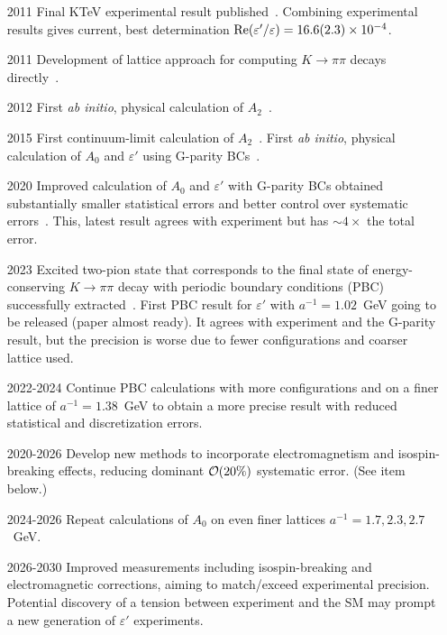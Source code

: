 \documentclass[prd,showpacs,showkeys,preprintnumbers,floatfix,
nofootinbib%
]{revtex4-2}
\begin{document}
\begin{itemize}
    \item[2011] Final KTeV experimental result published~\cite{KTeV:2010sng}. Combining experimental results gives current, best determination ${\rm Re}(\varepsilon'/\varepsilon)=16.6(2.3)\times 10^{-4}$.
    \item[2011] Development of lattice approach for computing $K\to\pi\pi$ decays directly~\cite{Blum:2011pu}.
    \item[2012] First {\it ab initio}, physical calculation of $A_2$~\cite{Blum:2011ng,Blum:2012uk}.
    \item[2015] First continuum-limit calculation of $A_2$~\cite{Blum:2015ywa}. First {\it ab initio}, physical calculation of $A_0$ and $\varepsilon'$ using G-parity BCs~\cite{RBC:2015gro}.
    \item[2020] Improved calculation of $A_0$ and $\varepsilon'$ with G-parity BCs obtained substantially smaller statistical errors and better control over systematic errors~\cite{RBC:2020kdj}. This, latest result agrees with experiment but has ${\sim}4\times$ the total error.
    \item[2023] Excited two-pion state that corresponds to the final state of energy-conserving $K\to\pi\pi$ decay with periodic boundary conditions (PBC) successfully extracted~\cite{Blum:2023vhp}.  First PBC result for $\varepsilon'$ with $a^{-1}=1.02$~GeV going to be released (paper almost ready).  It agrees with experiment and the G-parity result, but the precision is worse due to fewer configurations and coarser lattice used.
    \item[2022-2024] Continue PBC calculations with more configurations and on a finer lattice of $a^{-1}=1.38$~GeV to obtain a more precise result with reduced statistical and discretization errors.
    \item[2020-2026] Develop new methods to incorporate electromagnetism and isospin-breaking effects, reducing dominant ${\cal O}(20\%)$ systematic error.  (See item below.)
    \item[2024-2026] Repeat calculations of $A_0$ on even finer lattices $a^{-1}=1.7, 2.3, 2.7$~GeV. 
    \item[2026-2030] Improved measurements including isospin-breaking and electromagnetic corrections, aiming to match/exceed experimental precision. Potential discovery of a tension between experiment and the SM may prompt a new generation of $\varepsilon'$ experiments. 
\end{itemize}
\end{document}
